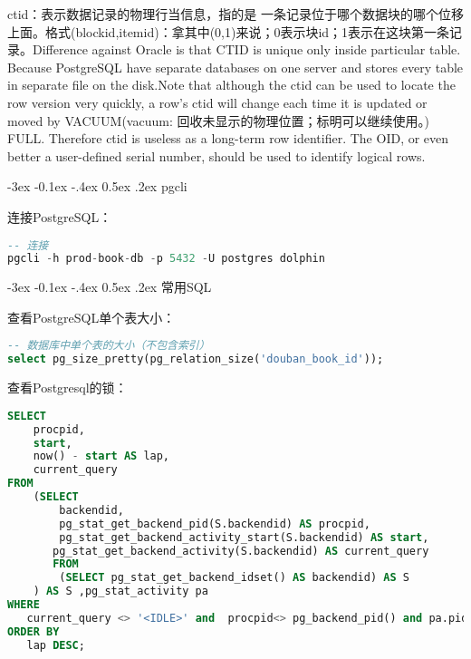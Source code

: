 \documentclass[8pt]{book}
\makeatletter
\numberwithin{dummy}{section}
\theoremstyle{ocrenumbox}
\theoremstyle{blacknumex}
\theoremstyle{blacknumbox}
\theoremstyle{ocrenum}
\renewcommand{\subsection}{\@startsection {subsection}{2}{\z@}
	{-3ex \@plus -0.1ex \@minus -.4ex}
	{0.5ex \@plus.2ex }
	{\normalfont\sffamily\bfseries}}
\makeatother
\begin{document}
ctid：表示数据记录的物理行当信息，指的是 一条记录位于哪个数据块的哪个位移上面。格式(blockid,itemid)：拿其中(0,1)来说；0表示块id；1表示在这块第一条记录。Difference against Oracle is that CTID is unique only inside particular table. Because PostgreSQL have separate databases on one server and stores every table in separate file on the disk.Note that although the ctid can be used to locate the row version very quickly, a row's ctid will change each time it is updated or moved by VACUUM(vacuum: 回收未显示的物理位置；标明可以继续使用。) FULL. Therefore ctid is useless as a long-term row identifier. The OID, or even better a user-defined serial number, should be used to identify logical rows.

\subsection{pgcli}

连接PostgreSQL：

\begin{lstlisting}[language=SQL]
-- 连接
pgcli -h prod-book-db -p 5432 -U postgres dolphin
\end{lstlisting}



\subsection{常用SQL}

查看PostgreSQL单个表大小：

\begin{lstlisting}[language=SQL]
-- 数据库中单个表的大小（不包含索引）
select pg_size_pretty(pg_relation_size('douban_book_id'));
\end{lstlisting}

查看Postgresql的锁：

\begin{lstlisting}[language=SQL]
SELECT   
    procpid,   
    start,   
    now() - start AS lap,   
    current_query   
FROM   
    (SELECT   
        backendid,   
        pg_stat_get_backend_pid(S.backendid) AS procpid,   
        pg_stat_get_backend_activity_start(S.backendid) AS start,   
       pg_stat_get_backend_activity(S.backendid) AS current_query   
       FROM   
        (SELECT pg_stat_get_backend_idset() AS backendid) AS S   
    ) AS S ,pg_stat_activity pa  
WHERE   
   current_query <> '<IDLE>' and  procpid<> pg_backend_pid() and pa.pid=s.procpid and pa.state<>'idle'  
ORDER BY   
   lap DESC;
\end{lstlisting}
\end{document}
